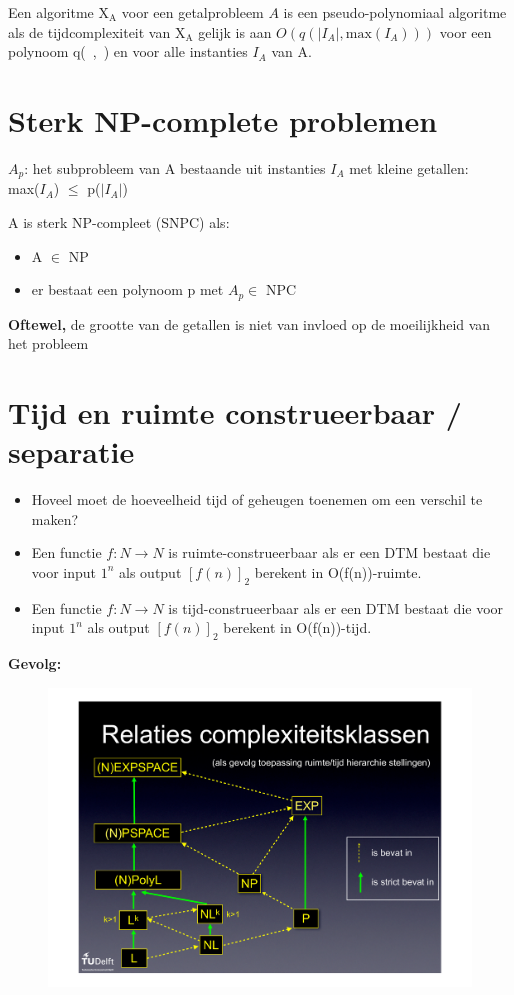 \documentclass[]{article}
\begin{document}
\medskip

Een algoritme X$_\text{A}$ voor een getalprobleem $A$ is een pseudo-polynomiaal algoritme als de tijdcomplexiteit van X$_\text{A}$ gelijk is aan $O(q(|I_A|, \text{max}(I_A)))$ voor een polynoom q(~,~) en voor alle instanties $I_A$ van A.

\section*{Sterk NP-complete problemen}

$A_p$: het subprobleem van A bestaande uit instanties $I_A$ met kleine getallen: \\
max($I_A$) $\leq$ p($|I_A|$)

A is sterk NP-compleet (SNPC) als:

\begin{itemize}
\item A $\in$ NP
\item er bestaat een polynoom p met $A_p \in$ NPC
\end{itemize}

\textbf{Oftewel,} de grootte van de getallen is niet van invloed op de moeilijkheid van het probleem

\section*{Tijd en ruimte construeerbaar / separatie}

\begin{itemize}
\item Hoveel moet de hoeveelheid tijd of geheugen toenemen om een verschil te maken?

\item Een functie $f:N \rightarrow N$ is ruimte-construeerbaar als er een DTM bestaat die voor input $1^n$ als output $[f(n)]_2$ berekent in O(f(n))-ruimte.

\item Een functie $f:N \rightarrow N$ is tijd-construeerbaar als er een DTM bestaat die voor input $1^n$ als output $[f(n)]_2$ berekent in O(f(n))-tijd.

\end{itemize}

\textbf{Gevolg:}

\begin{figure}[H]
\centering
\includegraphics[width=0.6\columnwidth]{slides/relaties}
\end{figure}
\end{document}
